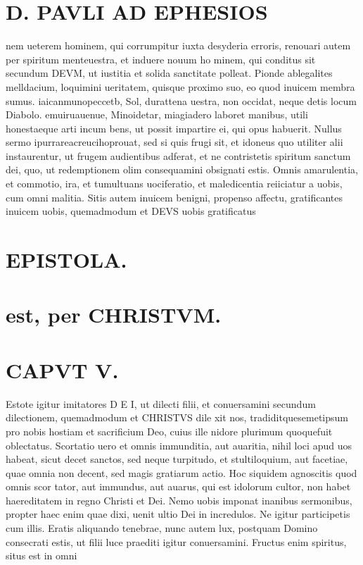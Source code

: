 \documentclass{article}
\begin{document}
\begin{pages}
\section*{D. PAVLI AD EPHESIOS }
\marginpar{[ p.8. ]}
\marginpar{[ p.9.  ]}
\marginpar{[ p.10.  ]}
\marginpar{[ p.11.  ]}
\marginpar{[ p.12.  ]}
\marginpar{[ p.13.  ]}\pstart nem ueterem hominem, qui corrumpitur iuxta desyderia erroris, renouari autem per spiritum menteuestra, et induere nouum ho minem, qui conditus sit secundum DEVM, ut iustitia et solida sanctitate polleat.  \pend\pstart Pionde ablegalites melldacium, loquimini ueritatem, quisque proximo suo, eo quod inuicem membra sumus.  \pend\pstart iaicanmunopeccetb, Sol, durattena uestra, non occidat, neque detis locum Diabolo.  \pend\pstart emuiruauenue, Minoidetar, miagiadero laboret manibus, utili honestaeque arti incum bens, ut possit impartire ei, qui opus habuerit.  \pend\pstart Nullus sermo ipurrareacreucihoprouat, sed si quis frugi sit, et idoneus quo utiliter alii instaurentur, ut frugem audientibus adferat, et ne contristetis spiritum sanctum dei, quo, ut redemptionem olim consequamini obsignati estis.  \pend\pstart Omnis amarulentia, et commotio,  ira, et tumultuans uociferatio, et maledicentia reiiciatur a uobis, cum omni malitia.  \pend\pstart Sitis autem inuicem benigni, propenso affectu, gratificantes inuicem uobis, quemadmodum et DEVS uobis gratificatus  \pend
\section*{EPISTOLA.  }
\section*{est, per CHRISTVM.  }
\marginpar{[ p.u ]}
\marginpar{[ p.1.  ]}
\marginpar{[ p.2.  ]}
\marginpar{[ p.3.  ]}
\marginpar{[ p.4.  ]}
\marginpar{[ p.5.  ]}
\section{CAPVT V. }\pstart Estote igitur imitatores D E I, ut dilecti filii, et conuersamini secundum dilectionem, quemadmodum et CHRISTVS dile xit nos, tradiditquesemetipsum pro nobis hostiam et sacrificium Deo, cuius ille nidore plurimum quoquefuit oblectatus.  \pend\pstart Scortatio uero et omnis immunditia, aut auaritia, nihil loci apud uos habeat, sicut decet sanctos, sed neque turpitudo, et stultiloquium, aut facetiae, quae omnia non decent, sed magis gratiarum actio.  \pend\pstart Hoc siquidem agnoscitis quod omnis scor tator, aut immundus, aut auarus, qui est idolorum cultor, non habet haereditatem in regno Christi et Dei. Nemo uobis imponat inanibus sermonibus, propter haec enim quae dixi, uenit ultio Dei in incredulos.  \pend\pstart Ne igitur participetis cum illis. Eratis aliquando tenebrae, nunc autem lux, postquam Domino consecrati estis, ut filii luce praediti igitur conuersamini.  \pend\pstart Fructus enim spiritus, situs est in omni  \pend

\end{pages}
\end{document}
